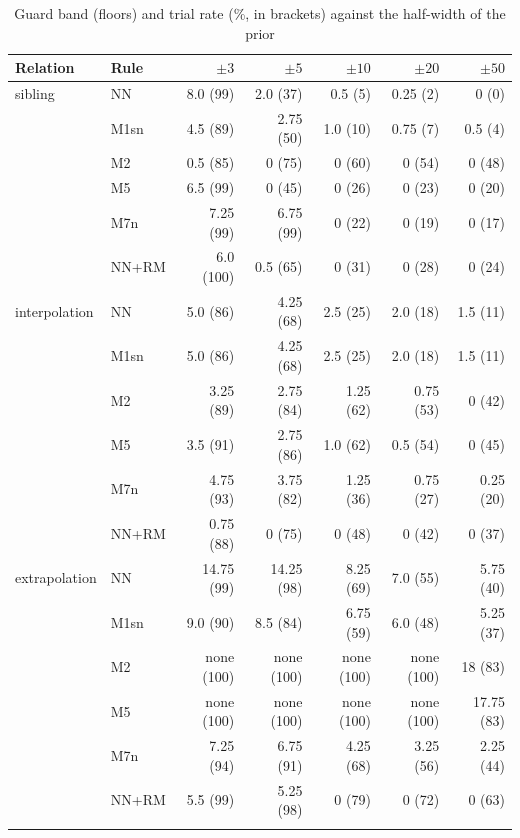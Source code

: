 \documentclass[pdflatex,sn-basic]{sn-jnl}
\newcommand{\tabsizesmall}{\footnotesize}
\begin{document}
\begin{table}[p]
\tabsizesmall
\setlength{\tabcolsep}{3pt}
\caption{Guard band (floors) and trial rate (\%, in brackets) against the half-width of the prior}\label{tab:s-prior}
\begin{tabular}{@{}llrrrrr@{}}
\toprule
Relation & Rule & $\pm3$ & $\pm5$ & $\pm10$ & $\pm20$ & $\pm50$ \\
\midrule
sibling & NN & 8.0 (99) & 2.0 (37) & 0.5 (5) & 0.25 (2) & 0 (0) \\
 & M1sn & 4.5 (89) & 2.75 (50) & 1.0 (10) & 0.75 (7) & 0.5 (4) \\
 & M2 & 0.5 (85) & 0 (75) & 0 (60) & 0 (54) & 0 (48) \\
 & M5 & 6.5 (99) & 0 (45) & 0 (26) & 0 (23) & 0 (20) \\
 & M7n & 7.25 (99) & 6.75 (99) & 0 (22) & 0 (19) & 0 (17) \\
 & NN+RM & 6.0 (100) & 0.5 (65) & 0 (31) & 0 (28) & 0 (24) \\
interpolation & NN & 5.0 (86) & 4.25 (68) & 2.5 (25) & 2.0 (18) & 1.5 (11) \\
 & M1sn & 5.0 (86) & 4.25 (68) & 2.5 (25) & 2.0 (18) & 1.5 (11) \\
 & M2 & 3.25 (89) & 2.75 (84) & 1.25 (62) & 0.75 (53) & 0 (42) \\
 & M5 & 3.5 (91) & 2.75 (86) & 1.0 (62) & 0.5 (54) & 0 (45) \\
 & M7n & 4.75 (93) & 3.75 (82) & 1.25 (36) & 0.75 (27) & 0.25 (20) \\
 & NN+RM & 0.75 (88) & 0 (75) & 0 (48) & 0 (42) & 0 (37) \\
extrapolation & NN & 14.75 (99) & 14.25 (98) & 8.25 (69) & 7.0 (55) & 5.75 (40) \\
 & M1sn & 9.0 (90) & 8.5 (84) & 6.75 (59) & 6.0 (48) & 5.25 (37) \\
 & M2 & none (100) & none (100) & none (100) & none (100) & 18 (83) \\
 & M5 & none (100) & none (100) & none (100) & none (100) & 17.75 (83) \\
 & M7n & 7.25 (94) & 6.75 (91) & 4.25 (68) & 3.25 (56) & 2.25 (44) \\
 & NN+RM & 5.5 (99) & 5.25 (98) & 0 (79) & 0 (72) & 0 (63) \\
\botrule
\end{tabular}
\end{table}
\end{document}
